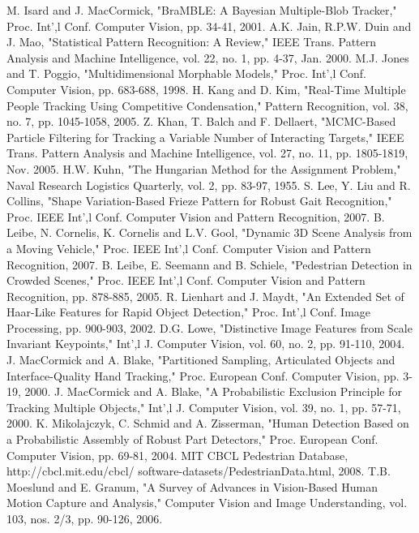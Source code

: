 \documentclass[10pt,letterpaper,journal,compsoc]{IEEEtran}
\begin{document}
\begin{thebibliography}{99}
M. Isard and J. MacCormick, "BraMBLE: A Bayesian Multiple-Blob Tracker," Proc. Int',l Conf. Computer Vision, pp. 34-41, 2001. 
A.K. Jain, R.P.W. Duin and J. Mao, "Statistical Pattern Recognition: A Review," IEEE Trans. Pattern Analysis and Machine Intelligence, vol. 22, no. 1, pp. 4-37, Jan. 2000. 
M.J. Jones and T. Poggio, "Multidimensional Morphable Models," Proc. Int',l Conf. Computer Vision, pp. 683-688, 1998. 
H. Kang and D. Kim, "Real-Time Multiple People Tracking Using Competitive Condensation," Pattern Recognition, vol. 38, no. 7, pp. 1045-1058, 2005. 
Z. Khan, T. Balch and F. Dellaert, "MCMC-Based Particle Filtering for Tracking a Variable Number of Interacting Targets," IEEE Trans. Pattern Analysis and Machine Intelligence, vol. 27, no. 11, pp. 1805-1819, Nov. 2005. 
H.W. Kuhn, "The Hungarian Method for the Assignment Problem," Naval Research Logistics Quarterly, vol. 2, pp. 83-97, 1955. 
S. Lee, Y. Liu and R. Collins, "Shape Variation-Based Frieze Pattern for Robust Gait Recognition," Proc. IEEE Int',l Conf. Computer Vision and Pattern Recognition, 2007. 
B. Leibe, N. Cornelis, K. Cornelis and L.V. Gool, "Dynamic 3D Scene Analysis from a Moving Vehicle," Proc. IEEE Int',l Conf. Computer Vision and Pattern Recognition, 2007. 
B. Leibe, E. Seemann and B. Schiele, "Pedestrian Detection in Crowded Scenes," Proc. IEEE Int',l Conf. Computer Vision and Pattern Recognition, pp. 878-885, 2005. 
R. Lienhart and J. Maydt, "An Extended Set of Haar-Like Features for Rapid Object Detection," Proc. Int',l Conf. Image Processing, pp. 900-903, 2002. 
D.G. Lowe, "Distinctive Image Features from Scale Invariant Keypoints," Int',l J. Computer Vision, vol. 60, no. 2, pp. 91-110, 2004. 
J. MacCormick and A. Blake, "Partitioned Sampling, Articulated Objects and Interface-Quality Hand Tracking," Proc. European Conf. Computer Vision, pp. 3-19, 2000. 
J. MacCormick and A. Blake, "A Probabilistic Exclusion Principle for Tracking Multiple Objects," Int',l J. Computer Vision, vol. 39, no. 1, pp. 57-71, 2000. 
K. Mikolajczyk, C. Schmid and A. Zisserman, "Human Detection Based on a Probabilistic Assembly of Robust Part Detectors," Proc. European Conf. Computer Vision, pp. 69-81, 2004. 
MIT CBCL Pedestrian Database, http://cbcl.mit.edu/cbcl/ software-datasets/PedestrianData.html, 2008. 
T.B. Moeslund and E. Granum, "A Survey of Advances in Vision-Based Human Motion Capture and Analysis," Computer Vision and Image Understanding, vol. 103, nos. 2/3, pp. 90-126, 2006. 

\end{thebibliography}
\end{document}
